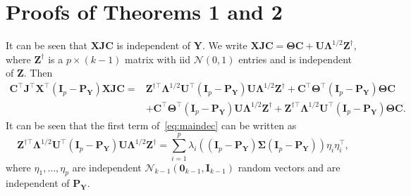 \documentclass[10pt]{book}
\theoremstyle{definition}
\newcommand{\bZ}{\mathbf{Z}}
\newcommand{\bX}{\mathbf{X}}
\newcommand{\bP}{\mathbf{P}}
\newcommand{\bY}{\mathbf{Y}}
\newcommand{\bJ}{\mathbf{J}}
\newcommand{\bC}{\mathbf{C}}
\newcommand{\bI}{\mathbf{I}}
\newcommand{\bU}{\mathbf{U}}
\newcommand{\bfsym}[1]{\ensuremath{\boldsymbol{#1}}}
\def\bLambda {\bfsym {\Lambda}}
\def\bSigma {\bfsym {\Sigma}}
\def\bTheta {\bfsym {\Theta}}
\begin{document}
\section{Proofs of Theorems 1 and 2}
\setcounter{equation}{0}
It can be seen that $\bX\bJ\bC$ is independent of $\bY$.
We write
$
\bX\bJ\bC = \bTheta \bC + \bU\bLambda^{1/2} \bZ^{\dagger}
$, 
where $\bZ^{\dagger}$ is a $p\times (k-1)$ matrix with iid $\mathcal{N}(0,1)$ entries and is independent of $\bZ$.
Then 
\begin{equation}\label{eq:maindec}
\begin{aligned}
\bC^\top\bJ^\top \bX^\top(\bI_p-\bP_{\bY}) \bX\bJ\bC
=&
\bZ^{\dagger \top} \bLambda^{1/2}\bU^\top (\bI_p-\bP_{\bY})\bU\bLambda^{1/2}\bZ^{\dagger}+
 \bC^\top \bTheta^\top (\bI_p -\bP_{\bY})\bTheta \bC\\
 &+ \bC^\top \bTheta^\top (\bI_p -\bP_{\bY})\bU\bLambda^{1/2}\bZ^{\dagger}+
 \bZ^{\dagger \top} \bLambda^{1/2}\bU^\top (\bI_p-\bP_{\bY})\bTheta \bC.
\end{aligned}
\end{equation}
    It can be seen that the first term of~\eqref{eq:maindec} can be written as
\begin{equation*}
    \bZ^{\dagger \top} \bLambda^{1/2}\bU^\top (\bI_p-\bP_{\bY})\bU\bLambda^{1/2}\bZ^{\dagger}=
\sum_{i=1}^p \lambda_i ( (\bI_p-\bP_{\bY})\bSigma (\bI_p-\bP_{\bY}))\eta_i \eta_i^\top,
\end{equation*}
where $\eta_1,\ldots, \eta_p$ are independent $\mathcal{N}_{k-1}(\mathbf{0}_{k-1},\bI_{k-1})$ random vectors and are independent of $\bP_{\bY}$.
\end{document}

